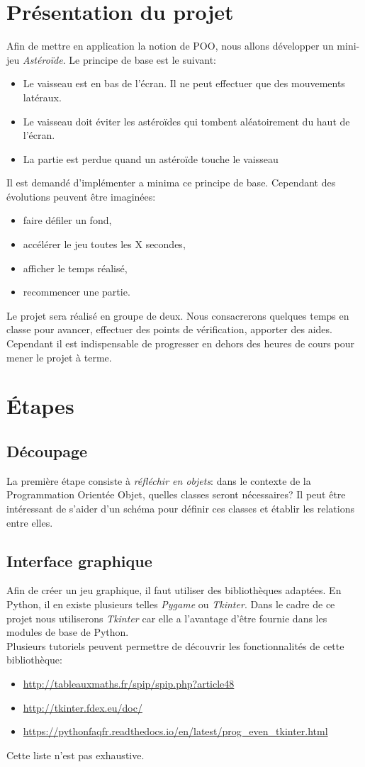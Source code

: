 \documentclass[a4paper,11pt]{article}
\begin{document}
\begin{Form}
\section{Présentation du projet}
Afin de mettre en application la notion de POO, nous allons développer un mini-jeu \emph{Astéroïde}. Le principe de base est le suivant:
\begin{itemize}
\item Le vaisseau est en bas de l'écran. Il ne peut effectuer que des mouvements latéraux.
\item Le vaisseau doit éviter les astéroïdes qui tombent aléatoirement du haut de l'écran.
\item La partie est perdue quand un astéroïde touche le vaisseau
\end{itemize}
Il est demandé d'implémenter a minima ce principe de base. Cependant des évolutions peuvent être imaginées:
\begin{itemize}
\item faire défiler un fond,
\item accélérer le jeu toutes les X secondes,
\item afficher le temps réalisé,
\item recommencer une partie.
\end{itemize}
\medskip
Le projet sera réalisé en groupe de deux. Nous consacrerons quelques temps en classe pour avancer, effectuer des points de vérification, apporter des aides. Cependant il est indispensable de progresser en dehors des heures de cours pour mener le projet à terme. 
\section{Étapes}
\subsection{Découpage}
La première étape consiste à \emph{réfléchir en objets}: dans le contexte de la Programmation Orientée Objet, quelles classes seront nécessaires? Il peut être intéressant de s'aider d'un schéma pour définir ces classes et établir les relations entre elles.
\subsection{Interface graphique}
Afin de créer un jeu graphique, il faut utiliser des bibliothèques adaptées. En Python, il en existe plusieurs telles \emph{Pygame} ou \emph{Tkinter}. Dans le cadre de ce projet nous utiliserons \emph{Tkinter} car elle a l'avantage d'être fournie dans les modules de base de Python.\\
Plusieurs tutoriels peuvent permettre de découvrir les fonctionnalités de cette bibliothèque:
\begin{itemize}
\item \url{http://tableauxmaths.fr/spip/spip.php?article48}
\item \url{http://tkinter.fdex.eu/doc/}
\item \url{https://pythonfaqfr.readthedocs.io/en/latest/prog_even_tkinter.html}
\end{itemize}
Cette liste n'est pas exhaustive.

\end{Form}
\end{document}

